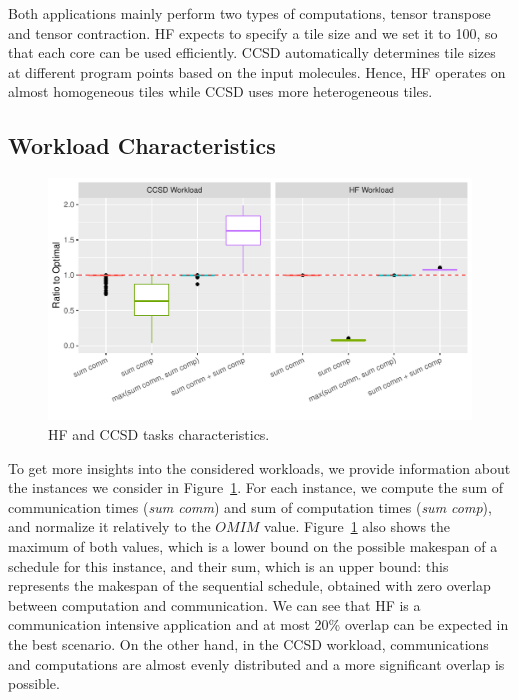 \documentclass[sigconf]{acmart}
\begin{document}
{		%
		Both applications mainly perform two types of computations, tensor transpose and tensor contraction. HF expects to specify a tile size and we set it to 100, so that each core can be used efficiently. CCSD automatically determines tile sizes at different program points based on the input molecules. Hence, HF operates on almost homogeneous tiles while CCSD uses more heterogeneous tiles.
		
		\subsection{Workload Characteristics}
		
		\begin{figure}[htb]
			\includegraphics[scale=0.5]{./results/application_properties.pdf}
			\caption{HF and CCSD tasks characteristics.}
			\label{fig:ApplicationProperties}
		\end{figure}	
		
		To get more insights into the considered workloads, we provide  information about the instances we consider in Figure~\ref{fig:ApplicationProperties}. For each instance, we compute the sum of communication times (\textit{sum comm}) and sum of computation times  (\textit{sum comp}), and normalize it relatively to the $OMIM$ value. Figure~\ref{fig:ApplicationProperties} also shows the maximum of both values, which is a lower bound on the possible makespan of a schedule for this instance, and their sum, which is an upper bound: this represents the makespan of the sequential schedule, obtained with zero overlap between computation and communication. We can see that HF is a communication intensive application and at most 20\% overlap can be expected in the best scenario. On the other hand, in the CCSD workload, communications and computations are almost evenly distributed and a more significant overlap is possible.
		
}
\end{document}
